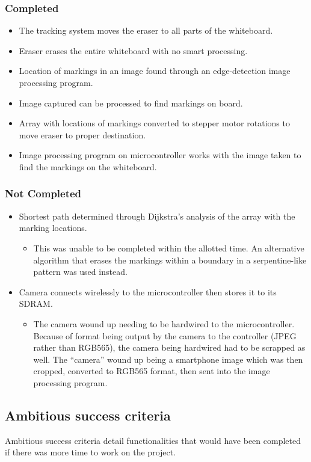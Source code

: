 \subsubsection{Completed}
\begin{itemize}
\item The tracking system moves the eraser to all parts of the whiteboard.
\item Eraser erases the entire whiteboard with no smart processing.
\item Location of markings in an image found through an edge-detection image processing program.
\item Image captured can be processed to find markings on board.
\item Array with locations of markings converted to stepper motor rotations to move eraser to proper destination.
\item Image processing program on microcontroller works with the image taken to find the markings on the whiteboard.\\
\end{itemize}
\subsubsection{Not Completed}
\begin{itemize}
\item Shortest path determined through Dijkstra's analysis of the array with the marking locations.
	\begin{itemize}
	\item This was unable to be completed within the allotted time. An alternative algorithm that erases the markings within a boundary in a serpentine-like pattern was used instead.
	\end{itemize}
\item Camera connects wirelessly to the microcontroller then stores it to its SDRAM.
	\begin{itemize}
	\item The camera wound up needing to be hardwired to the microcontroller. Because of format being output by the camera to the controller (JPEG rather than RGB565), the camera being hardwired had to be scrapped as well. The ``camera'' wound up being a smartphone image which was then cropped, converted to RGB565 format, then sent into the image processing program.
	\end{itemize}
\end{itemize}

\subsection{Ambitious success criteria}
Ambitious success criteria detail functionalities that would have been completed if there was more time to work on the project.\\
